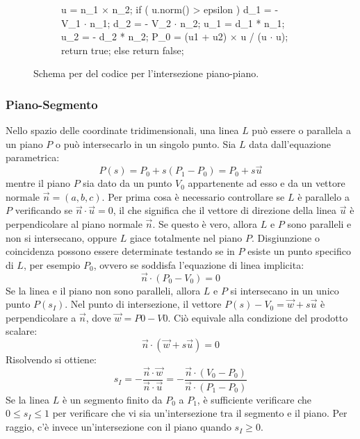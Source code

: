 \begin{figure}[htbp]
	\centering
	\begin{subfigure}{.65\linewidth}
		\begin{pseudoc}
	u = n_1 $\times$ n_2;
	if ( u.norm() > epsilon ) {
		d_1 = - V_1 $\cdot$ n_1;
		d_2 = - V_2 $\cdot$ n_2;
		u_1 = d_1 * n_1;
		u_2 = - d_2 * n_2;
		P_0 = (u1 + u2) $\times$ u / (u $\cdot$ u);
		return true;
	} else {
		return false;
	}
		\end{pseudoc}
	\end{subfigure}
	\caption{Schema per del codice per l'intersezione piano-piano.}
\end{figure}
%
\subsubsection{Piano-Segmento}
Nello spazio delle coordinate tridimensionali, una linea $L$ può essere o parallela a un piano $P$ o può intersecarlo in un singolo punto. Sia $L$ data dall'equazione parametrica:
\begin{equation}
P(s) = P_0 + s(P_1-P_0) = P_0 + s\vec{u}
\end{equation}
mentre il piano $P$ sia dato da un punto $V_0$ appartenente ad esso e da un vettore normale $\vec{n} = (a,b,c)$. Per prima cosa è necessario controllare se $L$ è parallelo a $P$ verificando se $\vec{n}\cdot\vec{u} = 0$, il che significa che il vettore di direzione della linea $\vec{u}$ è perpendicolare al piano normale $\vec{n}$. Se questo è vero, allora $L$ e $P$ sono paralleli e non si intersecano, oppure $L$ giace totalmente nel piano $P$. Disgiunzione o coincidenza possono essere determinate testando se in $P$ esiste un punto specifico di $L$, per esempio $P_0$, ovvero se soddisfa l'equazione di linea implicita:
\begin{equation}
\vec{n} \cdot (P_0-V_0) = 0
\end{equation}
Se la linea e il piano non sono paralleli, allora $L$ e $P$ si intersecano in un unico punto $P(s_I)$. Nel punto di intersezione, il vettore $P(s)-V_0 = \vec{w} + s\vec{u}$ è perpendicolare a $\vec{n}$, dove $\vec{w} = P0-V0$. Ciò equivale alla condizione del prodotto scalare:
\begin{equation}
\vec{n} \cdot (\vec{w}+s\vec{u}) = 0
\end{equation}
Risolvendo si ottiene:
\begin{equation}
s_I = -\frac{\vec{n}\cdot\vec{w}}{\vec{n}\cdot\vec{u}}
=
-\frac{\vec{n}\cdot(V_0-P_0)}{\vec{n}\cdot(P_1-P_0)}
\end{equation}
Se la linea $L$ è un segmento finito da $P_0$ a $P_1$, è sufficiente verificare che $0 \leq s_I \leq 1$ per verificare che vi sia un'intersezione tra il segmento e il piano. Per raggio, c'è invece un'intersezione con il piano quando $s_I \geq 0$.

